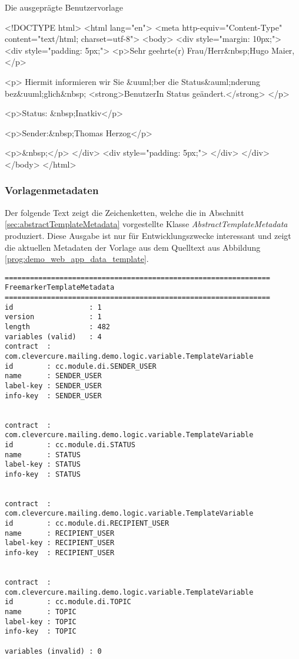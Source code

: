 \begin{program}[h]
\caption{Die ausgeprägte Benutzervorlage}
\label{prog:demo_web_app_data_parsed_template}
\begin{HtmlCode}
<!DOCTYPE html>
<html lang="en">
    <meta http-equiv="Content-Type" content="text/html; charset=utf-8">
<body>
<div style="margin: 10px;">
    <div style="padding: 5px;">
        <p>Sehr geehrte(r) Frau/Herr&nbsp;Hugo Maier,</p>

        <p>
            Hiermit informieren wir Sie &uuml;ber die 
            Status&auml;nderung bez&uuml;glich&nbsp;
            <strong>BenutzerIn Status geändert.</strong>
        </p>

        <p>Status: &nbsp;Inatkiv</p>

        <p>Sender:&nbsp;Thomas Herzog</p>

        <p>&nbsp;</p>
    </div>
    <div style="padding: 5px;">
    </div>
</div>
</body>
</html>
\end{HtmlCode}
\end{program}

\subsubsection{Vorlagenmetadaten}
Der folgende Text zeigt die Zeichenketten, welche die in Abschnitt \ref{sec:abstractTemplateMetadata} vorgestellte Klasse \emph{AbstractTemplateMetadata} produziert. Diese Ausgabe ist nur für Entwicklungszwecke interessant und zeigt die aktuellen Metadaten der Vorlage aus dem Quelltext aus Abbildung \ref{prog:demo_web_app_data_template}.

\begingroup
    \fontsize{9pt}{11pt}\selectfont
    \begin{verbatim}  
===============================================================
FreemarkerTemplateMetadata
===============================================================
id                  : 1
version             : 1
length              : 482
variables (valid)   : 4
contract  : com.clevercure.mailing.demo.logic.variable.TemplateVariable
id        : cc.module.di.SENDER_USER
name      : SENDER_USER
label-key : SENDER_USER
info-key  : SENDER_USER


contract  : com.clevercure.mailing.demo.logic.variable.TemplateVariable
id        : cc.module.di.STATUS
name      : STATUS
label-key : STATUS
info-key  : STATUS


contract  : com.clevercure.mailing.demo.logic.variable.TemplateVariable
id        : cc.module.di.RECIPIENT_USER
name      : RECIPIENT_USER
label-key : RECIPIENT_USER
info-key  : RECIPIENT_USER


contract  : com.clevercure.mailing.demo.logic.variable.TemplateVariable
id        : cc.module.di.TOPIC
name      : TOPIC
label-key : TOPIC
info-key  : TOPIC

variables (invalid) : 0
    \end{verbatim}  
\endgroup

